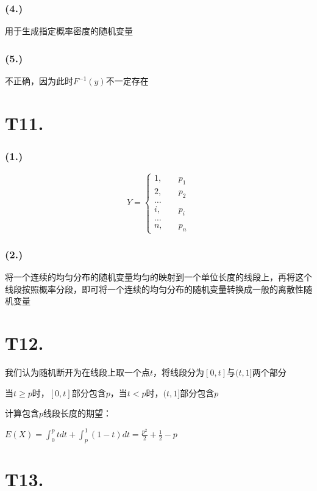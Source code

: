 \documentclass{article}
\newcommand\f[2]{\frac{#1}{#2}}
\begin{document}
\subsubsection*{(4.)}

用于生成指定概率密度的随机变量

\subsubsection*{(5.)}

不正确，因为此时$F^{-1}(y)$不一定存在

\section*{T11. }

\subsubsection*{(1.)}

\[
Y=
\begin{cases}
    1, &\quad p_1\\
    2, &\quad p_2\\
    \dots\\
    i, &\quad p_i\\
    \dots\\
    n, &\quad p_n
\end{cases}
\]

\subsubsection*{(2.)}

将一个连续的均匀分布的随机变量均匀的映射到一个单位长度的线段上，再将这个线段按照概率分段，即可将一个连续的均匀分布的随机变量转换成一般的离散性随机变量

\section*{T12. }

我们认为随机断开为在线段上取一个点$t$，将线段分为$[0,t]$与$(t,1]$两个部分

当$t\geq p$时，$[0,t]$部分包含$p$，当$t<p$时，$(t,1]$部分包含$p$

计算包含$p$线段长度的期望：

$E(X)=\int_{0}^{p}tdt+\int_{p}^{1}(1-t)dt=\f{p^2}{2}+\f{1}{2}-p$

\section*{T13. }
\end{document}
